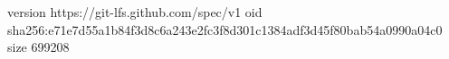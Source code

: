 version https://git-lfs.github.com/spec/v1
oid sha256:e71e7d55a1b84f3d8c6a243e2fc3f8d301c1384adf3d45f80bab54a0990a04c0
size 699208
